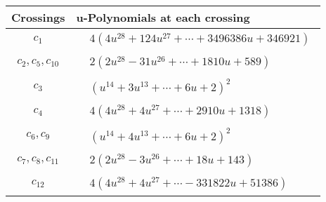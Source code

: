 \documentclass[1p]{elsarticle_modified}
\theoremstyle{definition}
\begin{document}
\begin{tabular}{m{50pt}|m{274pt}}
Crossings & \hspace{64pt}u-Polynomials at each crossing \\
\hline $$\begin{aligned}c_{1}\end{aligned}$$&$\begin{aligned}
&4(4 u^{28}+124 u^{27}+\cdots+3496386 u+346921)
\end{aligned}$\\
\hline $$\begin{aligned}c_{2},c_{5},c_{10}\end{aligned}$$&$\begin{aligned}
&2(2 u^{28}-31 u^{26}+\cdots+1810 u+589)
\end{aligned}$\\
\hline $$\begin{aligned}c_{3}\end{aligned}$$&$\begin{aligned}
&(u^{14}+3 u^{13}+\cdots+6 u+2)^{2}
\end{aligned}$\\
\hline $$\begin{aligned}c_{4}\end{aligned}$$&$\begin{aligned}
&4(4 u^{28}+4 u^{27}+\cdots+2910 u+1318)
\end{aligned}$\\
\hline $$\begin{aligned}c_{6},c_{9}\end{aligned}$$&$\begin{aligned}
&(u^{14}+4 u^{13}+\cdots+6 u+2)^{2}
\end{aligned}$\\
\hline $$\begin{aligned}c_{7},c_{8},c_{11}\end{aligned}$$&$\begin{aligned}
&2(2 u^{28}-3 u^{26}+\cdots+18 u+143)
\end{aligned}$\\
\hline $$\begin{aligned}c_{12}\end{aligned}$$&$\begin{aligned}
&4(4 u^{28}+4 u^{27}+\cdots-331822 u+51386)
\end{aligned}$\\
\hline
\end{tabular}\\~\\
\end{document}
